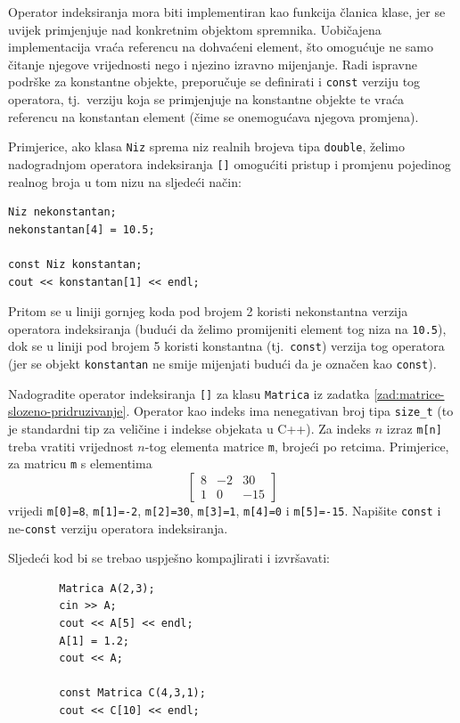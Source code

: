 Operator indeksiranja mora biti implementiran kao funkcija članica klase, jer se uvijek primjenjuje nad konkretnim objektom spremnika. 
Uobičajena implementacija vraća referencu na dohvaćeni element, što omogućuje ne samo čitanje njegove vrijednosti nego i njezino izravno mijenjanje.
Radi ispravne podrške za konstantne objekte, preporučuje se definirati i \texttt{const} verziju tog operatora,
tj.\ verziju koja se primjenjuje na konstantne objekte te vraća referencu na konstantan element
(čime se onemogućava njegova promjena).
\medskip

Primjerice,
ako klasa \texttt{Niz} sprema niz realnih brojeva tipa \texttt{double},
želimo nadogradnjom operatora indeksiranja \texttt{[]}
omogućiti pristup i promjenu pojedinog realnog broja u tom nizu na sljedeći način:
\begin{verbatim}
Niz nekonstantan;
nekonstantan[4] = 10.5;

const Niz konstantan;
cout << konstantan[1] << endl;
\end{verbatim}

Pritom se u liniji gornjeg koda pod brojem 2 koristi nekonstantna verzija operatora indeksiranja
(budući da želimo promijeniti element tog niza na \texttt{10.5}),
dok se u liniji pod brojem 5 koristi konstantna (tj.\ \texttt{const}) verzija
tog operatora
(jer se objekt \texttt{konstantan}
ne smije mijenjati budući da je označen kao \texttt{const}).

\begin{zadatak}\label{zad:matrica-indeksiranje}
    Nadogradite operator indeksiranja \texttt{[]} za klasu \texttt{Matrica} iz zadatka \ref{zad:matrice-slozeno-pridruzivanje}.
    Operator kao indeks ima nenegativan broj tipa \texttt{size\_t}
    (to je standardni tip za veličine i indekse objekata u C++).
    Za indeks $n$ izraz \texttt{m[n]} treba vratiti
    vrijednost $n$-tog elementa matrice \texttt{m}, 
    brojeći po retcima.
    Primjerice, za matricu \texttt{m} s elementima
    $$\begin{bmatrix}
        8 & -2 & 30 \\
        1 & 0 & -15
    \end{bmatrix}$$
    vrijedi \texttt{m[0]=8}, \texttt{m[1]=-2}, 
    \texttt{m[2]=30}, \texttt{m[3]=1},
    \texttt{m[4]=0} i \texttt{m[5]=-15}.
    Napišite \texttt{const} i ne-\texttt{const} verziju operatora indeksiranja.
    \medskip

    Sljedeći kod bi se trebao uspješno kompajlirati i izvršavati:
    \begin{verbatim}
        Matrica A(2,3);
        cin >> A;
        cout << A[5] << endl;
        A[1] = 1.2;
        cout << A;
        
        const Matrica C(4,3,1);
        cout << C[10] << endl;
    \end{verbatim}
\end{zadatak}


